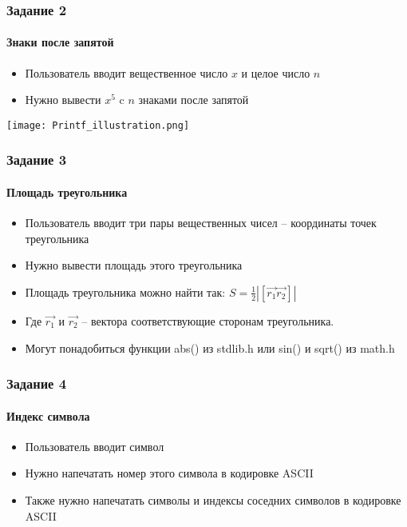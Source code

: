 \documentclass[12pt,pdf,hyperref={unicode}]{beamer}
\begin{document}
\begin{frame}
\frametitle{Задание 2} 
\framesubtitle{Знаки после запятой} 
\begin{center}
\begin{itemize}
\item Пользователь вводит вещественное число $x$ и целое число $n$ \\
\item Нужно вывести $x^5$ c $n$ знаками после запятой\\
\end{itemize}
\end{center}
\begin{center}
\texttt{[image: Printf\_illustration.png]}
\end{center}
\end{frame}

\begin{frame}
\frametitle{Задание 3} 
\framesubtitle{Площадь треугольника} 
\begin{center}
\begin{itemize}
\item Пользователь вводит три пары вещественных чисел -- координаты точек треугольника\\
\item Нужно вывести площадь этого треугольника\\
\item Площадь треугольника можно найти так: $S = \frac{1}{2}|[\vec{r_1} \vec{r_2}]|$\\
\item Где $\vec{r_1}$ и $\vec{r_2}$ -- вектора соответствующие сторонам треугольника.
\item Могут понадобиться функции abs() из stdlib.h или sin() и sqrt() из math.h
\end{itemize}
\end{center}
\end{frame}

\begin{frame}
\frametitle{Задание 4} 
\framesubtitle{Индекс символа} 
\begin{center}
\begin{itemize}
\item Пользователь вводит символ\\
\item Нужно напечатать номер этого символа в кодировке ASCII\\
\item Также нужно напечатать символы и индексы соседних символов в кодировке ASCII \\
\end{itemize}
\end{center}
\end{frame}

\fi
\end{document}
